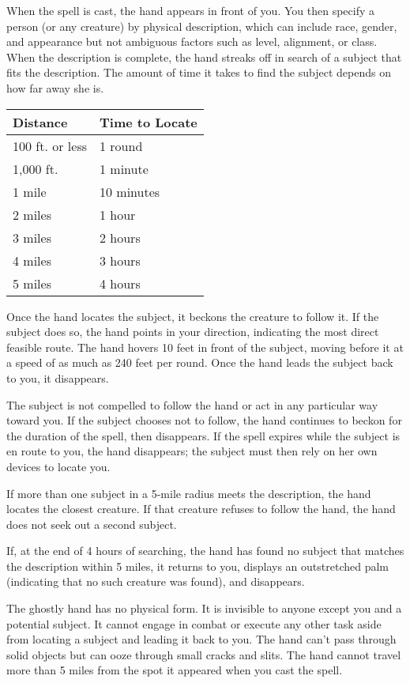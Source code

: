 \documentclass{article}
\begin{document}
When the spell is cast, the hand appears in front of you. You then specify a person 
(or any creature) by physical description, which can include race, gender, and 
appearance but not ambiguous factors such as level, alignment, or class. When the 
description is complete, the hand streaks off in search of a subject that fits 
the description. The amount of time it takes to find the subject depends on how 
far away she is.

\begin{tabular}{|>{\raggedright}p{53pt}|>{\raggedright}p{63pt}|}
\hline
D\textbf{istance} & T\textbf{ime to Locate}\tabularnewline
\hline
100 ft. or less & 1 round\tabularnewline
\hline
1,000 ft. & 1 minute\tabularnewline
\hline
1 mile & 10 minutes\tabularnewline
\hline
2 miles & 1 hour\tabularnewline
\hline
3 miles & 2 hours\tabularnewline
\hline
4 miles & 3 hours\tabularnewline
\hline
5 miles & 4 hours\tabularnewline
\hline
\end{tabular}

Once the hand locates the subject, it beckons the creature to follow it. If the 
subject does so, the hand points in your direction, indicating the most direct 
feasible route. The hand hovers 10 feet in front of the subject, moving before 
it at a speed of as much as 240 feet per round. Once the hand leads the subject 
back to you, it disappears.

The subject is not compelled to follow the hand or act in any particular way toward 
you. If the subject chooses not to follow, the hand continues to beckon for the 
duration of the spell, then disappears. If the spell expires while the subject 
is en route to you, the hand disappears; the subject must then rely on her own 
devices to locate you.

If more than one subject in a 5-mile radius meets the description, the hand locates 
the closest creature. If that creature refuses to follow the hand, the hand does 
not seek out a second subject.

If, at the end of 4 hours of searching, the hand has found no subject that matches 
the description within 5 miles, it returns to you, displays an outstretched palm 
(indicating that no such creature was found), and disappears.

The ghostly hand has no physical form. It is invisible to anyone except you and 
a potential subject. It cannot engage in combat or execute any other task aside 
from locating a subject and leading it back to you. The hand can't pass through 
solid objects but can ooze through small cracks and slits. The hand cannot travel 
more than 5 miles from the spot it appeared when you cast the spell.
\end{document}
